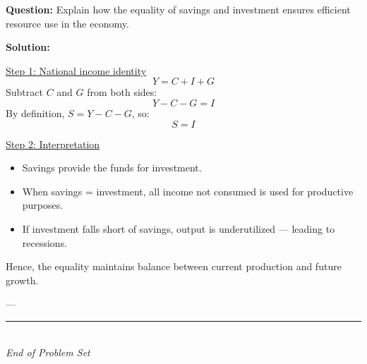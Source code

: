 \documentclass[12pt]{article}
\begin{document}
\textbf{Question:}  
Explain how the equality of savings and investment ensures efficient resource use in the economy.

\textbf{Solution:}

\underline{Step 1: National income identity}
\[
Y = C + I + G
\]
Subtract \(C\) and \(G\) from both sides:
\[
Y - C - G = I
\]
By definition, \(S = Y - C - G\), so:
\[
S = I
\]

\underline{Step 2: Interpretation}
\begin{itemize}
    \item Savings provide the funds for investment.
    \item When savings = investment, all income not consumed is used for productive purposes.
    \item If investment falls short of savings, output is underutilized — leading to recessions.
\end{itemize}

Hence, the equality maintains balance between current production and future growth.

---

\begin{center}
\rule{0.5\textwidth}{0.4pt}\\
\textit{End of Problem Set}
\end{center}
\end{document}
